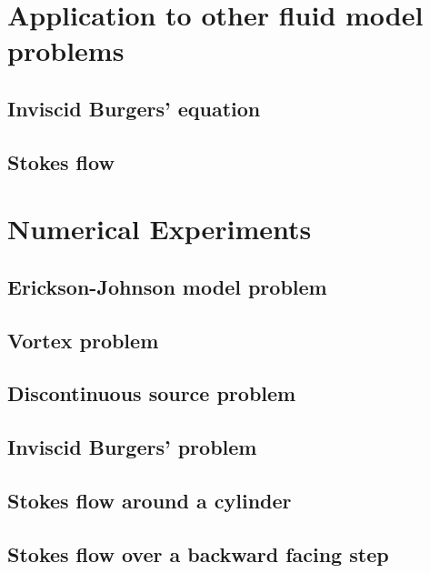 \documentclass[Proposal.tex]{subfiles}
\begin{document}
\section{Application to other fluid model problems}

\subsection{Inviscid Burgers' equation}

\subsection{Stokes flow}


\section{Numerical Experiments}

\subsection{Erickson-Johnson model problem}

\subsection{Vortex problem}

\subsection{Discontinuous source problem}

\subsection{Inviscid Burgers' problem}

\subsection{Stokes flow around a cylinder}

\subsection{Stokes flow over a backward facing step}
\end{document}
